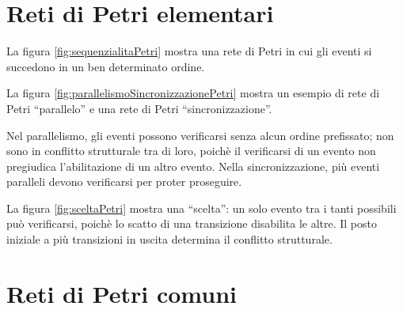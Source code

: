 \documentclass[a4paper]{report}
\begin{document}
\section{Reti di Petri elementari}
La figura \ref{fig:sequenzialitaPetri} mostra una rete di Petri in cui
gli eventi si succedono in un ben determinato ordine.

La figura \ref{fig:parallelismoSincronizzazionePetri} mostra un
esempio di rete di Petri ``parallelo'' e una rete di Petri
``sincronizzazione''. 

Nel parallelismo, gli eventi possono verificarsi senza alcun ordine
prefissato; non sono in conflitto strutturale tra di loro, poich\`e il
verificarsi di un evento non pregiudica l'abilitazione di un altro
evento. Nella sincronizzazione, pi\`u eventi paralleli devono
verificarsi per proter proseguire.

La figura \ref{fig:sceltaPetri} mostra una ``scelta'': un solo evento
tra i tanti possibili pu\`o verificarsi, poich\`e lo scatto di una
transizione disabilita le altre. Il posto iniziale a pi\`u transizioni
in uscita determina il conflitto strutturale.

\section{Reti di Petri comuni}
\end{document}
